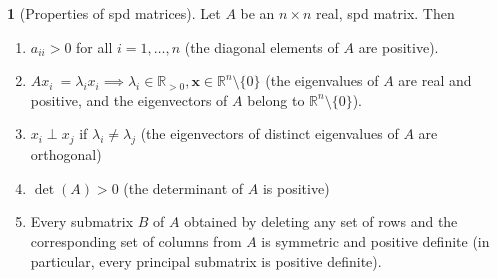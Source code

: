 \documentclass[12pt]{article}
\theoremstyle{definition}
\newtheorem{theorem}{\color{ForestGreen}{\textbf{Theorem}}}
\newcommand{\R}{\mathbb{R}}
\newcommand{\x}{\bm{x}}
\theoremstyle{definition}
\begin{document}
\begin{theorem}[Properties of spd matrices]
Let $A$ be an $n \times n$ real, spd matrix. Then
\begin{enumerate}
	\item $a_{ii} > 0$ for all $i=1, \ldots, n$ (the diagonal elements of $A$ are positive). 
	\item $A x_i \ = \lambda_i x_i \implies \lambda_i \in \R_{>0}, \x \in \R^n \setminus \{0\}$ (the eigenvalues of $A$ are real and positive, and the eigenvectors of $A$ belong to $\R^n \setminus \{0\}$).
	\item $x_i \perp x_j$ if $\lambda_i \neq \lambda_j$ (the eigenvectors of distinct eigenvalues of $A$ are orthogonal)
	\item $\det(A) > 0$ (the determinant of $A$ is positive)
	\item Every submatrix $B$ of $A$ obtained by deleting any set of rows and the corresponding set of columns from $A$ is symmetric and positive definite (in particular, every principal submatrix is positive definite). 
\end{enumerate}
\end{theorem}
\end{document}
